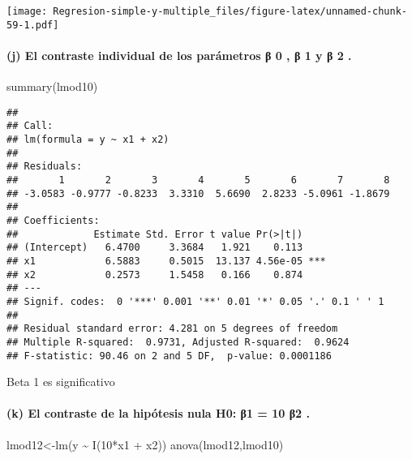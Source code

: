 \documentclass[
]{article}
\newenvironment{Shaded}{\begin{snugshade}}{\end{snugshade}}
\newcommand{\DecValTok}[1]{\textcolor[rgb]{0.00,0.00,0.81}{#1}}
\newcommand{\FunctionTok}[1]{\textcolor[rgb]{0.00,0.00,0.00}{#1}}
\newcommand{\NormalTok}[1]{#1}
\newcommand{\OtherTok}[1]{\textcolor[rgb]{0.56,0.35,0.01}{#1}}
\newcommand{\SpecialCharTok}[1]{\textcolor[rgb]{0.00,0.00,0.00}{#1}}
\begin{document}
\texttt{[image: Regresion-simple-y-multiple\_files/figure-latex/unnamed-chunk-59-1.pdf]}

\hypertarget{j-el-contraste-individual-de-los-paruxe1metros-ux3b2-0-ux3b2-1-y-ux3b2-2-.}{%
\paragraph{(j) El contraste individual de los parámetros β 0 , β 1 y β 2
.}\label{j-el-contraste-individual-de-los-paruxe1metros-ux3b2-0-ux3b2-1-y-ux3b2-2-.}}

\begin{Shaded}
\begin{Highlighting}[]
\FunctionTok{summary}\NormalTok{(lmod10)}
\end{Highlighting}
\end{Shaded}

\begin{verbatim}
## 
## Call:
## lm(formula = y ~ x1 + x2)
## 
## Residuals:
##       1       2       3       4       5       6       7       8 
## -3.0583 -0.9777 -0.8233  3.3310  5.6690  2.8233 -5.0961 -1.8679 
## 
## Coefficients:
##             Estimate Std. Error t value Pr(>|t|)    
## (Intercept)   6.4700     3.3684   1.921    0.113    
## x1            6.5883     0.5015  13.137 4.56e-05 ***
## x2            0.2573     1.5458   0.166    0.874    
## ---
## Signif. codes:  0 '***' 0.001 '**' 0.01 '*' 0.05 '.' 0.1 ' ' 1
## 
## Residual standard error: 4.281 on 5 degrees of freedom
## Multiple R-squared:  0.9731, Adjusted R-squared:  0.9624 
## F-statistic: 90.46 on 2 and 5 DF,  p-value: 0.0001186
\end{verbatim}

Beta 1 es significativo

\hypertarget{k-el-contraste-de-la-hipuxf3tesis-nula-h0-ux3b21-10-ux3b22-.}{%
\paragraph{(k) El contraste de la hipótesis nula H0: β1 = 10 β2
.}\label{k-el-contraste-de-la-hipuxf3tesis-nula-h0-ux3b21-10-ux3b22-.}}

\begin{Shaded}
\begin{Highlighting}[]
\NormalTok{lmod12}\OtherTok{\textless{}{-}}\FunctionTok{lm}\NormalTok{(y }\SpecialCharTok{\textasciitilde{}} \FunctionTok{I}\NormalTok{(}\DecValTok{10}\SpecialCharTok{*}\NormalTok{x1 }\SpecialCharTok{+}\NormalTok{ x2))}
\FunctionTok{anova}\NormalTok{(lmod12,lmod10)}
\end{Highlighting}
\end{Shaded}
\end{document}
